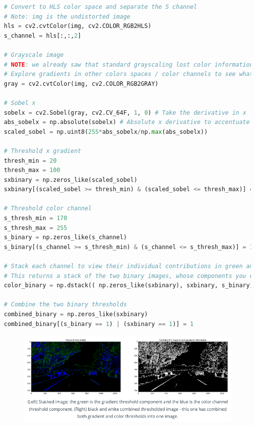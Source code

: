 \documentclass[12pt]{article}
\begin{document}
\begin{lstlisting}[language=Python]
# Convert to HLS color space and separate the S channel
# Note: img is the undistorted image
hls = cv2.cvtColor(img, cv2.COLOR_RGB2HLS)
s_channel = hls[:,:,2]

# Grayscale image
# NOTE: we already saw that standard grayscaling lost color information for the lane lines
# Explore gradients in other colors spaces / color channels to see what might work better
gray = cv2.cvtColor(img, cv2.COLOR_RGB2GRAY)

# Sobel x
sobelx = cv2.Sobel(gray, cv2.CV_64F, 1, 0) # Take the derivative in x
abs_sobelx = np.absolute(sobelx) # Absolute x derivative to accentuate lines away from horizontal
scaled_sobel = np.uint8(255*abs_sobelx/np.max(abs_sobelx))

# Threshold x gradient
thresh_min = 20
thresh_max = 100
sxbinary = np.zeros_like(scaled_sobel)
sxbinary[(scaled_sobel >= thresh_min) & (scaled_sobel <= thresh_max)] = 1

# Threshold color channel
s_thresh_min = 170
s_thresh_max = 255
s_binary = np.zeros_like(s_channel)
s_binary[(s_channel >= s_thresh_min) & (s_channel <= s_thresh_max)] = 1

# Stack each channel to view their individual contributions in green and blue respectively
# This returns a stack of the two binary images, whose components you can see as different colors
color_binary = np.dstack(( np.zeros_like(sxbinary), sxbinary, s_binary)) * 255

# Combine the two binary thresholds
combined_binary = np.zeros_like(sxbinary)
combined_binary[(s_binary == 1) | (sxbinary == 1)] = 1
\end{lstlisting}

\begin{figure}[htp]
    \centering
    \includegraphics[width=15cm]{color_gradient.png}
    \label{fig:color_gradient}
\end{figure}
\end{document}
